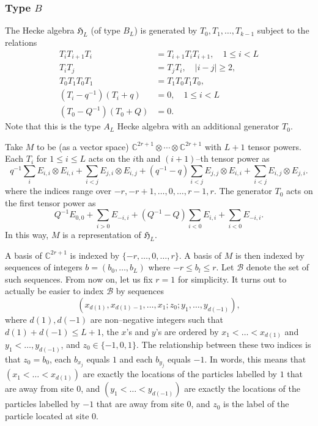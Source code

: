 \documentclass[12pt]{ximera}
\begin{document}
\subsubsection{Type $B$}
The Hecke algebra $\mathfrak{H}_L$ (of type $B_L$) is generated by $T_0,T_1,\ldots,T_{k-1}$ subject to the relations
\begin{align*}
T_i T_{i+1}T_i &= T_{i+1}T_i T_{i+1}, \quad 1 \leq i < L\\
T_i T_j &= T_j T_i, \quad \vert i-j\vert\geq 2,\\
T_0T_1T_0T_1 &= T_1T_0T_1T_0,\\
(T_i - q^{-1})(T_i + q) &=0, \quad 1 \leq i < L\\
(T_0-Q^{-1})(T_0+Q) &=0.
\end{align*}
Note that this is the type $A_L$ Hecke algebra with an additional generator $T_0$.

Take $M$ to be (as a vector space) $\mathbb{C}^{2r+1} \otimes \cdots \otimes \mathbb{C}^{2r+1}$ with $L+1$ tensor powers. Each $T_i$ for $1 \leq i \leq L$ acts on the $i$th and $(i+1)$--th tensor power as 
$$
q^{-1} \sum_i E_{i,i} \otimes E_{i,i} + \sum_{i<j} E_{j,i} \otimes E_{i,j} + (q^{-1}-q)\sum_{i<j} E_{j,j} \otimes E_{i,i} + \sum_{i<j} E_{i,j} \otimes E_{j,i}.
$$
where the indices range over $-r,-r+1,\ldots,0,\ldots,r-1,r$. The generator $T_0$ acts on the first tensor power as
$$
Q^{-1} E_{0,0} + \sum_{i>0} E_{-i,i} + (Q^{-1}-Q)\sum_{i<0} E_{i,i} + \sum_{i<0} E_{-i,i}.
$$
In this way, $M$ is a representation of $\mathfrak{H}_L$.


A basis of $\mathbb{C}^{2r+1}$ is indexed by $\{-r,\ldots,0,\ldots,r\}$. A basis of $M$ is then indexed by sequences of integers $ b= (b_0,\ldots,b_{L})$ where $-r \leq b_l \leq r$. Let $\mathcal{B}$ denote the set of such sequences. From now on, let us fix $r=1$ for simplicity. It turns out to actually be easier to index $\mathcal{B}$ by sequences
\begin{equation}\label{seq}
(x_{d(1)},x_{d(1)-1},\ldots,x_1;z_0;y_1,\ldots,y_{d(-1)}),
\end{equation}
where $ d(1),d(-1) $ are non--negative integers such that $d(1) + d(-1) \leq L+1$, the $x$'s and $y$'s are ordered by $x_1<\ldots < x_{d(1)}$ and $y_1<\ldots, y_{d(-1)}$, and $z_0 \in \{-1,0,1\}$. The relationship between these two indices is that  $z_0=b_0$, each $b_{x_j}$ equals $1$ and each $b_{y_j}$ equals $-1$. In words, this means that $(x_1<\ldots < x_{d(1)})$ are exactly the locations of the particles labelled by $1$ that are away from site $0$, and $(y_1 < \ldots < y_{d(-1)})$ are exactly the locations of the particles labelled by $-1$ that are away from site $0$, and $z_0$ is the label of the particle located at site $0$. 
\end{document}
